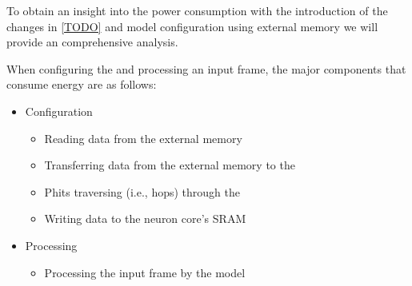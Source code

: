 To obtain an insight into the power consumption with the introduction of the \confignoc{} changes in \cref{TODO} and model configuration using external memory we will provide an comprehensive analysis.

When configuring the \graicore{} and processing an input frame, the major components that consume energy are as follows:
\begin{itemize}
    \item Configuration
    \begin{itemize}
        \item Reading data from the external memory
        \item Transferring data from the external memory to the \confignoc{}
        \item Phits traversing (i.e., hops) through the \confignoc{}
        \item Writing data to the neuron core's SRAM
    \end{itemize}
    \item Processing
    \begin{itemize}
        \item Processing the input frame by the model
    \end{itemize}
\end{itemize}
